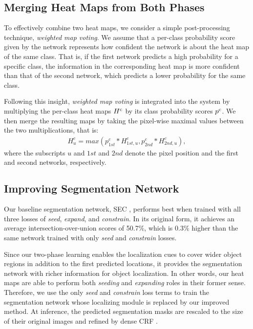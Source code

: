 \documentclass[10pt,twocolumn,letterpaper]{article}
\begin{document}
\subsection{Merging Heat Maps from Both Phases}
\label{sec::merging}
To effectively combine two heat maps, we consider a simple post-processing technique, \textit{weighted map voting}. We assume that a per-class probability score given by the network represents how confident the network is about the heat map of the same class. That is, if the first network predicts a high probability for a specific class, the information in the corresponding heat map is more confident than that of the second network, which predicts a lower probability for the same class.

Following this insight, \textit{weighted map voting} is integrated into the system by multiplying the per-class heat maps ${H\textsuperscript{c}}$ by its class probability scores ${p\textsuperscript{c}}$. We then merge the resulting maps by taking the pixel-wise maximal values between the two multiplications, that is:
\vspace{-1mm}
\begin{eqnarray}
   H_{u}^{c} =  max( p_{1st}^{c} * H_{1st,u}^{c}, p_{2nd}^{c} * H_{2nd,u}^{c}),
\label{eq:weightedMax}
\end{eqnarray}
where the subscripts $u$ and $1st$ and $2nd$ denote the pixel position and the first and second networks, respectively.



\subsection{Improving Segmentation Network}

Our baseline segmentation network, SEC \cite{kolesnikov2016seed}, performs best when trained with all three losses of \textit{seed}, \textit{expand}, and \textit{constrain}. In its original form, it achieves an average intersection-over-union scores of 50.7\%, which is 0.3\% higher than the same network trained with only \textit{seed} and \textit{constrain} losses.

Since our two-phase learning enables the localization cues to cover wider object regions in addition to the first predicted locations, it provides the segmentation network with richer information for object localization. In other words, our heat maps are able to perform both \textit{seeding} and \textit{expanding} roles in their former sense. Therefore, we use the only \textit{seed} and \textit{constrain} loss terms to train the segmentation network whose localizing module is replaced by our improved method. At inference, the predicted segmentation masks are rescaled to the size of their original images and refined by dense CRF \cite{ToyodaH08crf}.
\end{document}
